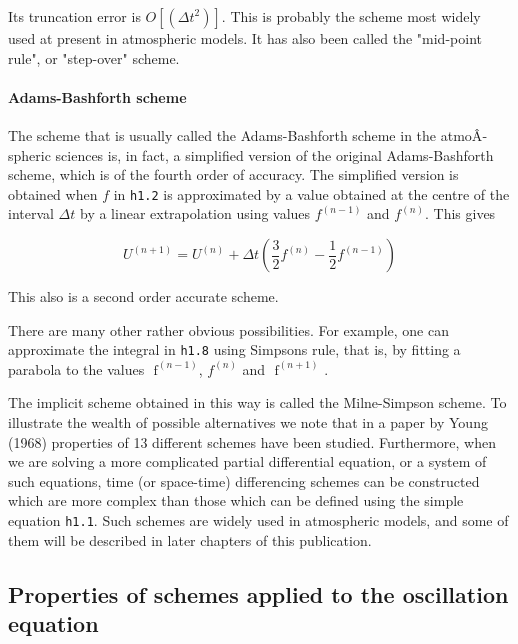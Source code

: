 Its truncation error is
\( O\left\lbrack \left( {\Delta t}^{2} \right) \right\rbrack\). This is
probably the scheme most widely used at present in atmospheric models.
It has also been called the "mid-point rule", or "step-over" scheme.

\paragraph{Adams-Bashforth scheme}\label{adams-bashforth-scheme}

The scheme that is usually called the Adams-Bashforth scheme in the
atmoÂ­spheric sciences is, in fact, a simplified version of the original
Adams-Bashforth scheme, which is of the fourth order of accuracy. The
simplified version is obtained when \(f\) in \texttt{h1.2} is
approximated by a value obtained at the centre of the interval
\(\Delta t\) by a linear extrapolation using values
\(f^{\left( n - 1 \right)}\) and \(f^{\left( n \right)}\). This gives

\[U^{\left( n + 1 \right)} = U^{\left( n \right)} + \Delta t\left( \frac{3}{2}f^{\left( n \right)} - \frac{1}{2}f^{\left( n - 1 \right)} \right)\]

This also is a second order accurate scheme.

There are many other rather obvious possibilities. For example, one can
approximate the integral in \texttt{h1.8} using
Simpson\textquotesingle s rule, that is, by fitting a parabola to the
values \(\text{ f}^{\left( n - 1 \right)}\), \(f^{\left( n \right)}\)
and \(\text{ f}^{\left( n + 1 \right)}\) .

The implicit scheme obtained in this way is called the Milne-Simpson
scheme. To illustrate the wealth of possible alternatives we note that
in a paper by Young (1968) properties of 13 different schemes have been
studied. Furthermore, when we are solving a more complicated partial
differential equation, or a system of such equations, time (or
space-time) differencing schemes can be constructed which are more
complex than those which can be defined using the simple equation
\texttt{h1.1}. Such schemes are widely used in atmospheric models, and
some of them will be described in later chapters of this publication.

\subsection{\texorpdfstring{\textbf{Properties of schemes applied to the
oscillation
equation}}{Properties of schemes applied to the oscillation equation}}\label{properties-of-schemes-applied-to-the-oscillation-equation}

